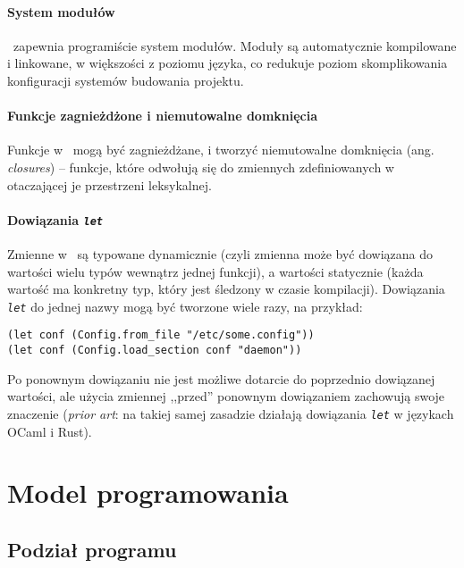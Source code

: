 \paragraph*{System modułów}

\ViuAct\ zapewnia programiście system modułów. Moduły są automatycznie kompilowane i linkowane, w większości z
poziomu języka, co redukuje poziom skomplikowania konfiguracji systemów budowania projektu.

\paragraph*{Funkcje zagnieżdżone i niemutowalne domknięcia}

Funkcje w \ViuAct\ mogą być zagnieżdżane, i tworzyć niemutowalne domknięcia (ang. \emph{closures}) -- funkcje,
które odwołują się do zmiennych zdefiniowanych w otaczającej je przestrzeni leksykalnej.

\paragraph*{Dowiązania \emph{\texttt{let}}}

Zmienne w \ViuAct\ są typowane dynamicznie (czyli zmienna może być dowiązana do wartości wielu typów wewnątrz
jednej funkcji), a wartości statycznie (każda wartość ma konkretny typ, który jest śledzony w czasie
kompilacji). Dowiązania \emph{\texttt{let}} do jednej nazwy mogą być tworzone wiele razy, na przykład:

\begin{lstlisting}
(let conf (Config.from_file "/etc/some.config"))
(let conf (Config.load_section conf "daemon"))
\end{lstlisting}

Po ponownym dowiązaniu nie jest możliwe dotarcie do poprzednio dowiązanej wartości, ale użycia zmiennej
,,przed'' ponownym dowiązaniem zachowują swoje znaczenie (\emph{prior art}: na takiej samej zasadzie działają
dowiązania \emph{\texttt{let}} w językach OCaml i Rust).

\section{Model programowania}
\label{specyfikacja_jezyka_viuact_model_programowania}

\subsection{Podział programu}

